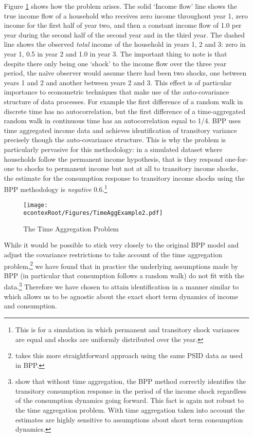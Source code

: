 \documentclass[titlepage]{\econtex}\newcommand{\texname}{ConsumptionHeterogeneity}
\begin{document}
Figure \ref{fig:TimeAgg} shows how the problem arises. The solid `Income flow' line shows the true income flow of a household who receives zero income throughout year 1, zero income for the first half of year two, and then a constant income flow of 1.0 per year during the second half of the second year and in the third year. The dashed line shows the observed \textit{total} income of the household in years 1, 2 and 3: zero in year 1, 0.5 in year 2 and 1.0 in year 3. The important thing to note is that despite there only being one `shock' to the income flow over the three year period, the na\"ive observer would assume there had been two shocks, one between years 1 and 2 and another between years 2 and 3. This effect is of particular importance to econometric techniques that make use of the auto-covariance structure of data processes. For example the first difference of a random walk in discrete time has no autocorrelation, but the first difference of a time-aggregated random walk in continuous time has an autocorrelation equal to 1/4. BPP uses time aggregated income data and achieves identification of transitory variance precisely though the auto-covariance structure. This is why the problem is particularly pervasive for this methodology: in a simulated dataset where households follow the permanent income hypothesis, that is they respond one-for-one to shocks to permanent income but not at all to transitory income shocks, the estimate for the consumption response to transitory income shocks using the BPP methodology is \textit{negative} 0.6.\footnote{This is for a simulation in which permanent and transitory shock variances are equal and shocks are uniformly distributed over the year.} 
	\begin{figure} 
	\begin{centering}
		\texttt{[image: \\econtexRoot/Figures/TimeAggExample2.pdf]} 
		\caption{The Time Aggregation Problem}
		\label{fig:TimeAgg}
	\end{centering}
\end{figure}

While it would be possible to stick very closely to the original BPP model and adjust the covariance restrictions to take account of the time aggregation problem,\footnote{\cite{crawley_time_2018} takes this more straightforward approach using the same PSID data as used in BPP.} we have found that in practice the underlying assumptions made by BPP (in particular that consumption follows a random walk) do not fit with the data.\footnote{\cite{kaplan_how_2010} show that without time aggregation, the BPP method correctly identifies the transitory consumption response in the period of the income shock regardless of the consumption dynamics going forward. This fact is again not robust to the time aggregation problem. With time aggregation taken into account the estimates are highly sensitive to assumptions about short term consumption dynamics.} Therefore we have chosen to attain identification in a manner similar to \cite{carroll_nature_1997} which allows us to be agnostic about the exact short term dynamics of income and consumption.
\end{document}
